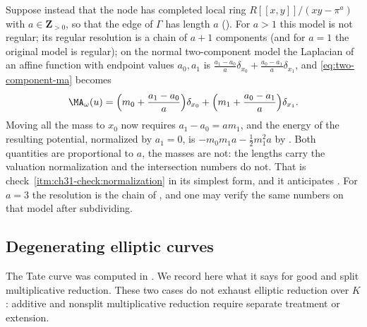 \begin{example}
\label{ex:ch31-nodal-thickness}
Suppose instead that the node has completed local ring
$R[[x,y]]/(xy-\pi^a)$ with $a\in\mathbf Z_{>0}$, so that the edge of
$\Gamma$ has length $a$ ().  For $a>1$ this model is not regular; its regular resolution is a chain
of $a+1$ components (and for $a=1$ the original model is regular); on the
normal two-component model the Laplacian of an affine function
with endpoint values $a_0,a_1$ is
$\tfrac{a_1-a_0}{a}\delta_{x_0}+\tfrac{a_0-a_1}{a}\delta_{x_1}$, and
\eqref{eq:two-component-ma} becomes
\[
 \MA_\omega(u)=\Bigl(m_0+\frac{a_1-a_0}{a}\Bigr)\delta_{x_0}
              +\Bigl(m_1+\frac{a_0-a_1}{a}\Bigr)\delta_{x_1}.
\]
Moving all the mass to $x_0$ now requires $a_1-a_0=am_1$, and the energy
of the resulting potential, normalized by $a_1=0$, is
$-m_0m_1a-\tfrac12m_1^2a$ by .  Both
quantities are proportional to $a$, the masses are not: the lengths carry
the valuation normalization and the intersection numbers do not.  That is
check~\cref{itm:ch31-check:normalization} in its simplest form, and it
anticipates .  For $a=3$ the resolution is the
chain of , and one may verify the same numbers on
that model after subdividing.
\end{example}

\subsection{Degenerating elliptic curves}
\label{sec:ch31-elliptic}

The Tate curve was computed in .  We record here what
it says for good and split multiplicative reduction.  These two cases
do not exhaust elliptic reduction over $K$: additive and nonsplit
multiplicative reduction require separate treatment or extension.


